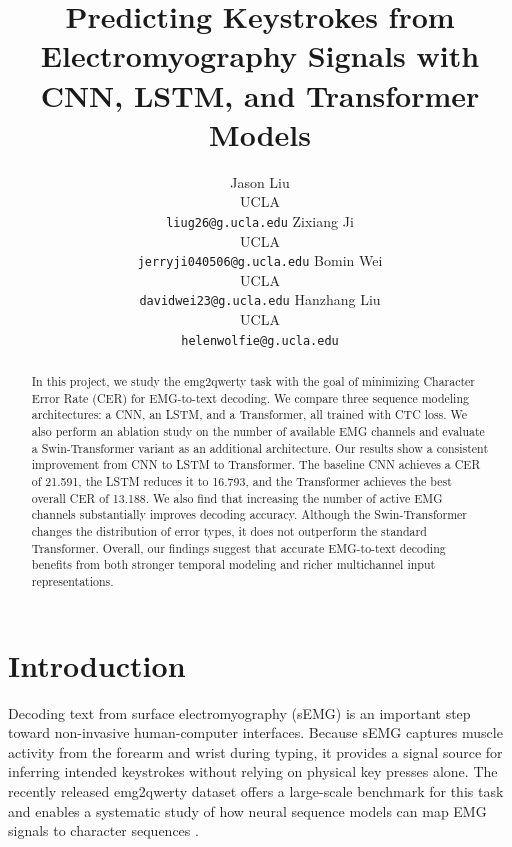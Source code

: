 \documentclass{article}
\title{Predicting Keystrokes from Electromyography Signals with CNN, LSTM, and Transformer Models}
\author{
  Jason Liu \\
  UCLA \\
  \texttt{liug26@g.ucla.edu}
  \And
  Zixiang Ji \\
  UCLA \\
  \texttt{jerryji040506@g.ucla.edu}
  \And
  Bomin Wei \\
  UCLA \\
  \texttt{davidwei23@g.ucla.edu}
  \And
  Hanzhang Liu \\
  UCLA \\
  \texttt{helenwolfie@g.ucla.edu}
}
\begin{document}
\maketitle

\begin{abstract}
In this project, we study the emg2qwerty task with the goal of minimizing Character Error Rate (CER) for EMG-to-text decoding. We compare three sequence modeling architectures: a CNN, an LSTM, and a Transformer, all trained with CTC loss. We also perform an ablation study on the number of available EMG channels and evaluate a Swin-Transformer variant as an additional architecture. Our results show a consistent improvement from CNN to LSTM to Transformer. The baseline CNN achieves a CER of 21.591, the LSTM reduces it to 16.793, and the Transformer achieves the best overall CER of 13.188. We also find that increasing the number of active EMG channels substantially improves decoding accuracy. Although the Swin-Transformer changes the distribution of error types, it does not outperform the standard Transformer. Overall, our findings suggest that accurate EMG-to-text decoding benefits from both stronger temporal modeling and richer multichannel input representations.

\end{abstract}

\section{Introduction}
Decoding text from surface electromyography (sEMG) is an important step toward non-invasive human-computer interfaces. Because sEMG captures muscle activity from the forearm and wrist during typing, it provides a signal source for inferring intended keystrokes without relying on physical key presses alone. The recently released emg2qwerty dataset offers a large-scale benchmark for this task and enables a systematic study of how neural sequence models can map EMG signals to character sequences \cite{emg2qwerty_neurips2024}.
\end{document}
